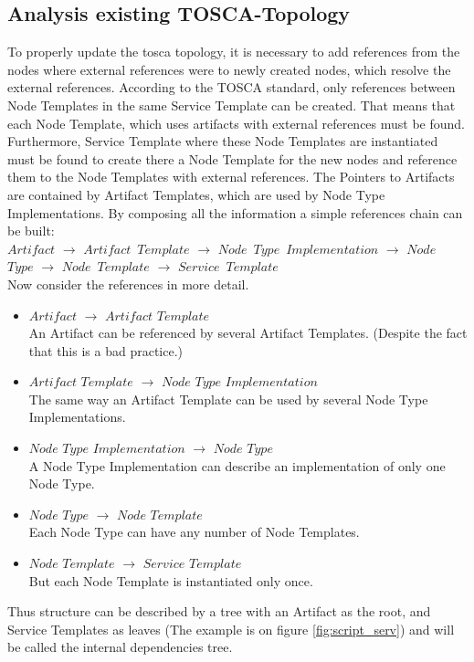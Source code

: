 \subsection{Analysis existing TOSCA-Topology}\label{subs:analyse}
To properly update the \gls{tosca} topology, it is necessary to add references from the nodes where external references were to newly created nodes, which resolve the external references. 
According to the TOSCA standard, only references between Node Templates in the same Service Template can be created.  
That means that each Node Template, which uses artifacts with external references must be found.
Furthermore, Service Template where these Node Templates are instantiated must be found to create there a Node Template for the new nodes and reference them to the Node Templates with external references.
The Pointers to Artifacts are contained by Artifact Templates, which are used by Node Type Implementations.
By composing all the information a simple references chain can be built:\\
$Artifact$ $\rightarrow$ $Artifact$~$Template$ $\rightarrow$ $Node$~$Type$~$Implementation$ $\rightarrow$ $Node$~$Type$ $\rightarrow$ $Node$~$Template$ $\rightarrow$ $Service$~$Template$\\
Now consider the references in more detail. 
\begin{itemize}
	\item $Artifact$ $\rightarrow$ $Artifact$ $Template$\\
	An Artifact can be referenced by several Artifact Templates. (Despite the fact that this is a bad practice.)
	\item  $Artifact$ $Template$ $\rightarrow$ $Node$ $Type$ $Implementation$ \\
	The same way an Artifact Template can be used by several Node Type Implementations.
	\item $Node$ $Type$ $Implementation$ $\rightarrow$ $Node$ $Type$ \\
	A Node Type Implementation can describe an implementation of only one Node Type.
	\item  $Node$ $Type$ $\rightarrow$ $Node$ $Template$\\
	Each Node Type can have any number of Node Templates.
	\item  $Node$ $Template$ $\rightarrow$ $Service$ $Template$\\
	But each Node Template is instantiated only once.
\end{itemize}
Thus structure can be described by a tree with an Artifact as the root, and Service Templates as leaves (The example is on figure \ref{fig:script_serv}) and will be called the internal dependencies tree.
